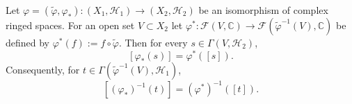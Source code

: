 Let $\varphi = (\tilde{\varphi}, \varphi_*): (X_1, \mathcal{H}_1) \rightarrow (X_2, \mathcal{H}_2)$ be an isomorphism of complex ringed spaces. For an open set $V \subset X_2$ let $\varphi^*: \mathcal{F}(V, \mathbb{C}) \rightarrow \mathcal{F}(\tilde{\varphi}^{-1}(V), \mathbb{C})$ be defined by $\varphi^*(f) := f \circ \tilde{\varphi}$. Then for every $s \in \Gamma(V, \mathcal{H}_2)$,
$$[\varphi_*(s)] = \varphi^*([s]).$$
Consequently, for $t \in \Gamma(\tilde{\varphi}^{-1}(V), \mathcal{H}_1)$,
$$[(\varphi_*)^{-1}(t)] = (\varphi^*)^{-1}([t]).$$
